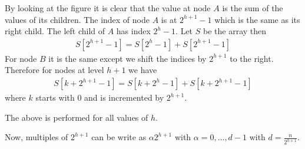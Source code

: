 \documentclass{article}
\begin{document}
    
By looking at the figure it is clear that the value at node $A$ is the sum of the values of its children.
The index of node $A$ is at $2^{h+1}-1$ which is the same as its right child. The left child of $A$ has index $2^h-1$. Let $S$ be the array then 
\begin{align*}
    S[2^{h+1}-1]=S[2^h-1]+S[2^{h+1}-1]
\end{align*}
For node $B$ it is the same except we shift the indices by $2^{h+1}$ to the right.
Therefore for nodes at level $h+1$ we have 
\begin{align*}
    S[k+2^{h+1}-1]=S[k+2^h-1]+S[k+2^{h+1}-1]
\end{align*}
where $k$ starts with 0 and is incremented by $2^{h+1}$.
\begin{algorithm*}
    \DontPrintSemicolon
\end{algorithm*}
The above is performed for all values of $h$.

\begin{algorithm*}
    \DontPrintSemicolon
\end{algorithm*}
Now, multiples of $2^{h+1}$ can be write as $\alpha 2^{h+1}$ with $\alpha=0,\ldots,d-1$ with $d=\frac{n}{2^{h+1}}$.
\begin{algorithm*}
    \DontPrintSemicolon
\end{algorithm*}
\end{document}
